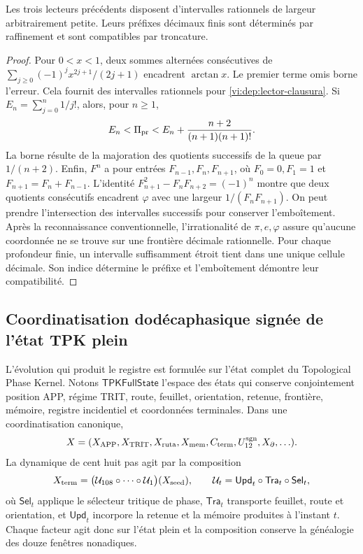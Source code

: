 \begin{proposition}
\label{vi:dep:prefijos}
Les trois lecteurs précédents disposent d’intervalles rationnels de largeur
arbitrairement petite. Leurs préfixes décimaux finis sont déterminés par
raffinement et sont compatibles par troncature.
\end{proposition}
\begin{proof}
Pour \(0<x<1\), deux sommes alternées consécutives de
\(\sum_{j\ge0}(-1)^jx^{2j+1}/(2j+1)\) encadrent \(\arctan x\).
Le premier terme omis borne l’erreur. Cela fournit des intervalles
rationnels pour \eqref{vi:dep:lector-clausura}.
Si \(E_n=\sum_{j=0}^n1/j!\), alors, pour \(n\ge1\),
\[
 E_n<\Pi_{\rm pr}<E_n+
 \frac{n+2}{(n+1)(n+1)!}.
\]
La borne résulte de la majoration des quotients successifs de la queue par
\(1/(n+2)\). Enfin, \(F^n\) a pour entrées
\(F_{n-1},F_n,F_{n+1}\), où \(F_0=0,F_1=1\) et
\(F_{n+1}=F_n+F_{n-1}\). L’identité
\(F_{n+1}^2-F_nF_{n+2}=(-1)^n\) montre que deux quotients consécutifs
encadrent \(\varphi\) avec une largeur \(1/(F_nF_{n+1})\).
On peut prendre l’intersection des intervalles successifs pour conserver
l’emboîtement. Après la reconnaissance conventionnelle, l’irrationalité de
\(\pi,e,\varphi\) assure qu’aucune coordonnée ne se trouve sur une frontière
décimale rationnelle. Pour chaque profondeur finie, un intervalle
suffisamment étroit tient dans une unique cellule décimale. Son indice
détermine le préfixe et l’emboîtement démontre leur compatibilité.
\end{proof}

\subsection{Coordinatisation dodécaphasique signée de l’état TPK plein}
\label{vi:dep:estado-pleno}

L’évolution qui produit le registre est formulée sur l’état complet du
Topological Phase Kernel. Notons
\(\mathsf{TPKFullState}\) l’espace des états qui conserve conjointement
position APP, régime TRIT, route, feuillet, orientation, retenue, frontière,
mémoire, registre incidentiel et coordonnées terminales. Dans une coordinatisation canonique,
\[
 X=(X_{\rm APP},X_{\rm TRIT},X_{\rm ruta},X_{\rm mem},
       C_{\rm term},U_{12}^{\rm sgn},X_{\partial},\ldots).
\]
La dynamique de cent huit pas agit par la composition
\begin{equation}
 X_{\rm term}
 =\bigl(\mathcal U_{108}\circ\cdots\circ\mathcal U_1\bigr)(X_{\rm seed}),
 \qquad
 \mathcal U_t=\mathsf{Upd}_t\circ\mathsf{Tra}_t\circ\mathsf{Sel}_t,
 \label{vi:dep:estado-terminal-108}
\end{equation}
où \(\mathsf{Sel}_t\) applique le sélecteur tritique de phase,
\(\mathsf{Tra}_t\) transporte feuillet, route et orientation, et
\(\mathsf{Upd}_t\) incorpore la retenue et la mémoire produites à
l’instant \(t\). Chaque facteur agit donc sur l’état plein et la
composition conserve la généalogie des douze fenêtres nonadiques.

